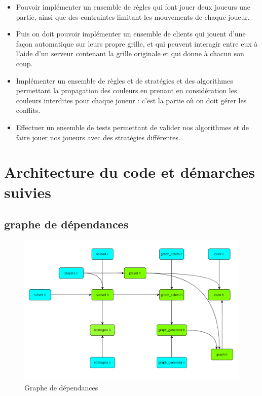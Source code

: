 \documentclass[11pt]{article}
\begin{document}
\begin{itemize}
\item Pouvoir implémenter un ensemble de règles qui font jouer deux joueurs une partie, ainsi que des contraintes limitant les mouvements de chaque joueur.
\item Puis on doit pouvoir implémenter un ensemble de clients qui jouent d'une façon automatique sur leurs propre grille, et qui peuvent interagir entre eux à l'aide d'un serveur contenant la grille originale et qui donne à chacun son coup.
\item Implémenter un ensemble de règles et de stratégies et des algorithmes permettant la propagation des couleurs en prenant en considération les couleurs interdites pour chaque joueur : c'est la partie où on doit gérer les conflits.
\item Effectuer un ensemble de tests permettant de valider nos algorithmes et de faire jouer nos joueurs avec des stratégies différentes.
\end{itemize}

\section{Architecture du code et démarches suivies}
\newpage
\subsection{graphe de dépendances}
\begin{figure}[h!]
    \centering
    \includegraphics[scale=0.5]{img/graphe_dependance.png}
    \caption{Graphe de dépendances}
    \label{fig:grpahe_dep}
\end{figure}
\end{document}
